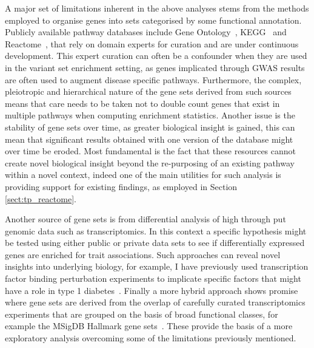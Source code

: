 \documentclass[a4paper,11pt]{report}
\begin{document}
A major set of limitations inherent in the above analyses stems from the methods employed to organise genes into sets categorised by some functional annotation. Publicly available pathway databases include Gene Ontology~\citep{AshburnerBallBlakeEtAl2000}, KEGG~\citep{KanehisaGoto2000} and Reactome~\citep{MilacicHawRothfelsEtAl2012}, that rely on domain experts for curation and are under continuous development. This expert curation can often be a confounder when they are used in the variant set enrichment setting, as genes implicated through GWAS results are often used to augment disease specific pathways.  Furthermore, the complex, pleiotropic and hierarchical nature of the gene sets derived from such sources means that care needs to be taken not to double count genes that exist in multiple pathways when computing enrichment statistics. Another issue is the stability of gene sets  over time, as greater biological insight is gained, this can mean that significant results obtained with one version of the database might over time be eroded. Most fundamental is the fact that these resources cannot create novel biological insight beyond  the re-purposing of an existing pathway within a novel context, indeed one of the main utilities for such analysis is providing support for existing findings, as employed in Section \ref{sect:tp_reactome}.

Another source of gene sets is from differential analysis of high through put genomic data such as transcriptomics. In this context a specific hypothesis might be tested using either public or private data sets to see if differentially expressed genes are enriched for trait associations. Such approaches can reveal novel insights into underlying biology, for example, I have previously used transcription factor binding perturbation experiments to implicate specific factors that might have a role in type 1 diabetes~\citep{Burren2014-vh}. Finally a more hybrid approach shows promise where gene sets are derived from the overlap of carefully curated transcriptomics experiments that are grouped on the basis of broad functional classes, for example  the MSigDB Hallmark gene sets~\citep{Subramanian2005-ke}. These provide the basis of a more exploratory analysis overcoming some of the limitations previously mentioned.  



\end{document}
